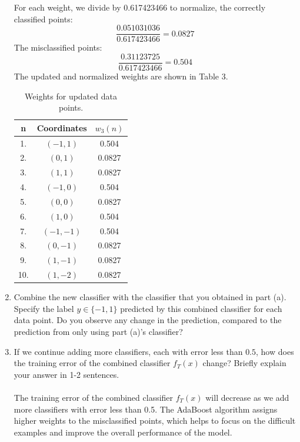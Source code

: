 \documentclass[a3paper,12pt]{extarticle} %
\begin{document}
\begin{enumerate}
\[\]
For each weight, we divide by 0.617423466 to normalize, the correctly classified points:
\[
\frac{0.051031036}{0.617423466} = 0.0827
\]
The misclassified points:
\[
\frac{0.31123725}{0.617423466} = 0.504
\]
The updated and normalized weights are shown in Table 3.
\begin{table}[h!]
    \centering
    \begin{tabular}{|c|c|c|}
    \hline
    \textbf{n} & \textbf{Coordinates} & \textbf{$w_3(n)$} \\ \hline
    1. & $(-1, 1)$ & 0.504  \\ \hline
    2. & $(0, 1)$ & 0.0827\\ \hline
    3. & $(1, 1)$ & 0.0827\\ \hline
    4. & $(-1, 0)$ & 0.504  \\ \hline
    5. & $(0, 0)$ & 0.0827 \\ \hline
    6. & $(1, 0)$ & 0.504  \\ \hline
    7. & $(-1, -1)$ & 0.504 \\ \hline
    8. & $(0, -1)$ & 0.0827 \\ \hline
    9. & $(1, -1)$ & 0.0827 \\ \hline
    10. & \((1, -2)\) & 0.0827 \\ \hline
    \end{tabular}
    \caption{Weights for updated data points.}
    \label{table:weights}
\end{table}

\item Combine the new classifier with the classifier that you obtained in part (a). Specify the label $y \in \{-1, 1\}$ predicted by this combined classifier for each data point. Do you observe any change in the prediction, compared to the prediction from only using part (a)'s classifier?

\item  If we continue adding more classifiers, each with error less than $0.5$, how does the training error of the combined classifier $f_T(x)$ change? Briefly explain your answer in 1-2 sentences.
\\\\ The training error of the combined classifier $f_T(x)$ will decrease as we add more classifiers with error less than 0.5. The AdaBoost algorithm assigns higher weights to the misclassified points, which helps to focus on the difficult examples and improve the overall performance of the model.
\newpage


\end{enumerate}
\end{document}
